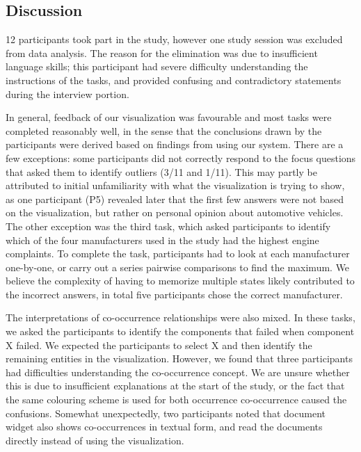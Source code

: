 \subsection{Discussion}
12 participants took part in the study, however one study session was excluded
from data analysis. The reason for the elimination was due to insufficient language skills; 
this participant had severe difficulty understanding the instructions of the tasks, 
and provided confusing and contradictory statements during the interview portion.



In general, feedback of our visualization was favourable and most tasks were
completed reasonably well, in the sense that the conclusions drawn by the
participants were derived based on findings from using our system. There are a
few exceptions: some participants did not correctly respond to the focus
questions that asked them to identify outliers (3/11 and 1/11). This may partly
be attributed to initial unfamiliarity with what the visualization is trying to
show, as one participant (P5) revealed later that the first few answers were not
based on the visualization, but rather on personal opinion about automotive
vehicles. The other exception was the third task, which asked participants to identify
which of the four manufacturers used in the study had the highest engine
complaints. To complete the task, participants had to look at each
manufacturer one-by-one, or carry out a series pairwise comparisons to find the
maximum. We believe the complexity of having to memorize multiple states likely
contributed to the incorrect answers, in total five participants chose the correct
manufacturer. 

The interpretations of co-occurrence relationships were also mixed. In these
tasks, we asked the participants to identify the components that failed when
component X failed. We expected the participants to select X and then identify
the remaining entities in the visualization. However, we found that three participants
had difficulties understanding the co-occurrence concept. We are unsure whether
this is due to insufficient explanations at the start of the study, or the fact
that the same colouring scheme is used for both occurrence co-occurrence caused
the confusions. Somewhat unexpectedly, two participants noted that document
widget also shows co-occurrences in textual form, and read the documents
directly instead of using the \threed visualization.


